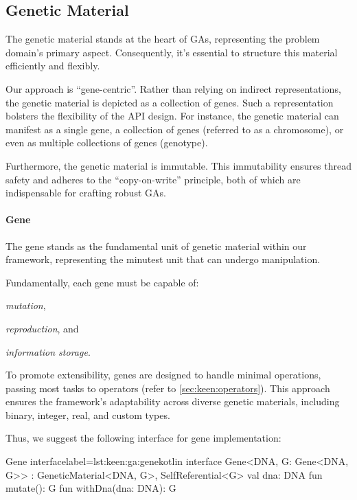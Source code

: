 \subsection{Genetic Material}
\label{sec:keen:ga:material}
  The genetic material stands at the heart of GAs, representing the problem 
  domain's primary aspect.
  Consequently, it's essential to structure this material efficiently and 
  flexibly.

  Our approach is \enquote{gene-centric}.
  Rather than relying on indirect representations, the genetic material is 
  depicted as a collection of genes.
  Such a representation bolsters the flexibility of the API design.
  For instance, the genetic material can manifest as a single gene, a 
  collection of genes (referred to as a chromosome), or even as multiple 
  collections of genes (genotype).

  Furthermore, the genetic material is immutable.
  This immutability ensures thread safety and adheres to the 
  \enquote{copy-on-write} principle, both of which are indispensable for 
  crafting robust GAs.

  \paragraph{Gene}
    The gene stands as the fundamental unit of genetic material within our 
    framework, representing the minutest unit that can undergo manipulation.

    Fundamentally, each gene must be capable of:
    \begin{enumerate*}
      \item \textit{mutation},
      \item \textit{reproduction}, and
      \item \textit{information storage}.
    \end{enumerate*}
    To promote extensibility, genes are designed to handle minimal 
    operations, passing most tasks to operators 
    (refer to \vref{sec:keen:operators}).
    This approach ensures the framework's adaptability across diverse 
    genetic materials, including binary, integer, real, and custom types.

    Thus, we suggest the following interface for gene implementation:

    \begin{code}{Gene interface}{label={lst:keen:ga:gene}}{kotlin}
      interface Gene<DNA, G: Gene<DNA, G>> : GeneticMaterial<DNA, G>,
                                             SelfReferential<G> {
          val dna: DNA
          fun mutate(): G
          fun withDna(dna: DNA): G
      }
    \end{code}

